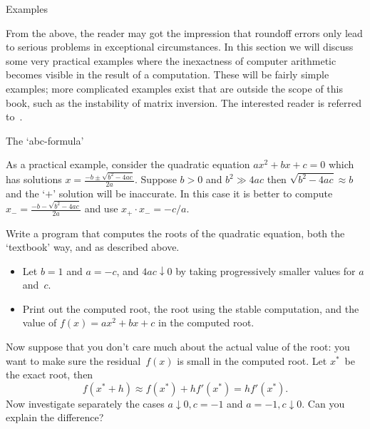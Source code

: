  {Examples}

From the above, the reader may got the impression that roundoff errors
only lead to serious problems in exceptional circumstances. In this
section we will discuss some very practical examples where the
inexactness of computer arithmetic becomes visible in the result of a
computation. These will be fairly simple examples; more complicated
examples exist that are outside the scope of this book, such as the
instability of matrix inversion. The interested reader is referred
to~\cite{Wilkinson:roundoff,Higham:2002:ASN}.

 {The `abc-formula'}
\label{sec:abc-formula}

As a practical example, consider the quadratic equation $ax^2+bx+c=0$ 
which has solutions $x=\frac{-b\pm\sqrt{b^2-4ac}}{2a}$.
Suppose $b>0$ and $b^2\gg 4ac$ then $\sqrt{b^2-4ac}\approx b$ and
the `$+$' solution will be
inaccurate. In this case it is better 
to compute $x_-=\frac{-b-\sqrt{b^2-4ac}}{2a}$ and use $x_+\cdot x_-=-c/a$.


\begin{exercise}
  Write a program that computes the roots of the quadratic equation, both
  the `textbook' way, and as described above. 
  \begin{itemize}
  \item Let $b=1$ and $a=-c$, and $4ac\downarrow 0$ by taking progressively smaller
    values for $a$ and~$c$.
  \item Print out the computed root, the root using the stable computation,
    and the value of $f(x)=ax^2+bx+c$ in the computed root.
  \end{itemize}
  Now suppose that you don't care much about the actual value of the root:
  you want to make sure the residual~$f(x)$ is small in the computed root.
  Let $x^*$~be the exact root, then
  \[ f(x^*+h)\approx f(x^*)+hf'(x^*) = hf'(x^*). \]
  Now investigate separately the cases $a\downarrow 0,c=-1$ and $a=-1,c\downarrow0$.
  Can you explain the difference?
\end{exercise}

